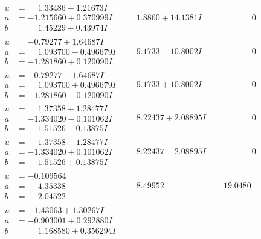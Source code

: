 \documentclass[1p]{elsarticle_modified}
\theoremstyle{definition}
\begin{document}
$$\begin{array}{c|c|c}
\begin{aligned}
u &= \phantom{-}1.33486 - 1.21673 I \\
a &= -1.215660 + 0.370999 I \\
b &= \phantom{-}1.45229 + 0.43974 I\end{aligned}
 & \phantom{-}1.8860 + 14.1381 I & \phantom{-0.000000 } 0 \\ \hline\begin{aligned}
u &= -0.79277 + 1.64687 I \\
a &= \phantom{-}1.093700 - 0.496679 I \\
b &= -1.281860 + 0.120090 I\end{aligned}
 & \phantom{-}9.1733 - 10.8002 I & \phantom{-0.000000 } 0 \\ \hline\begin{aligned}
u &= -0.79277 - 1.64687 I \\
a &= \phantom{-}1.093700 + 0.496679 I \\
b &= -1.281860 - 0.120090 I\end{aligned}
 & \phantom{-}9.1733 + 10.8002 I & \phantom{-0.000000 } 0 \\ \hline\begin{aligned}
u &= \phantom{-}1.37358 + 1.28477 I \\
a &= -1.334020 - 0.101062 I \\
b &= \phantom{-}1.51526 - 0.13875 I\end{aligned}
 & \phantom{-}8.22437 + 2.08895 I & \phantom{-0.000000 } 0 \\ \hline\begin{aligned}
u &= \phantom{-}1.37358 - 1.28477 I \\
a &= -1.334020 + 0.101062 I \\
b &= \phantom{-}1.51526 + 0.13875 I\end{aligned}
 & \phantom{-}8.22437 - 2.08895 I & \phantom{-0.000000 } 0 \\ \hline\begin{aligned}
u &= -0.109564\phantom{ +0.000000I} \\
a &= \phantom{-}4.35338\phantom{ +0.000000I} \\
b &= \phantom{-}2.04522\phantom{ +0.000000I}\end{aligned}
 & \phantom{-}8.49952\phantom{ +0.000000I} & \phantom{-}19.0480\phantom{ +0.000000I} \\ \hline\begin{aligned}
u &= -1.43063 + 1.30267 I \\
a &= -0.903001 + 0.292880 I \\
b &= \phantom{-}1.168580 + 0.356294 I\end{aligned}

\end{array}$$
\end{document}
